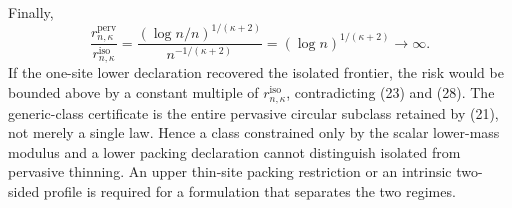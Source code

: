 Finally,
\[
 \frac{r_{n,\kappa}^{\mathrm{perv}}}{r_{n,\kappa}^{\mathrm{iso}}}
 =\frac{(\log n/n)^{1/(\kappa+2)}}{n^{-1/(\kappa+2)}}
 =(\log n)^{1/(\kappa+2)}\longrightarrow\infty. \tag{28}
\]
If the one-site lower declaration recovered the isolated frontier, the risk would be bounded above by a constant multiple of \(r_{n,\kappa}^{\mathrm{iso}}\), contradicting (23) and (28).  The generic-class certificate is the entire pervasive circular subclass retained by (21), not merely a single law.  Hence a class constrained only by the scalar lower-mass modulus and a lower packing declaration cannot distinguish isolated from pervasive thinning.  An upper thin-site packing restriction or an intrinsic two-sided profile is required for a formulation that separates the two regimes.
